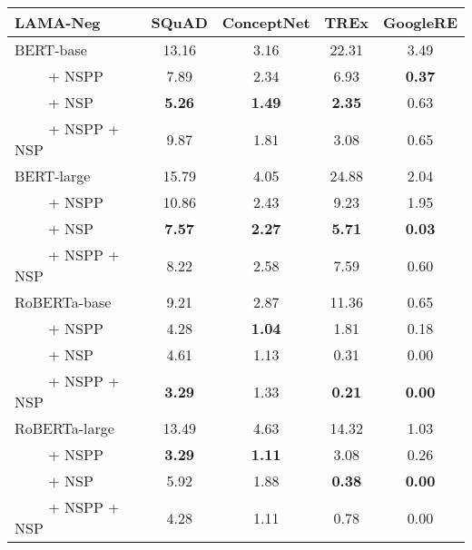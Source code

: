 \newcommand{\sig}{$^{\ast}$}
\setlength{\tabcolsep}{0.03in}
\small
\begin{tabular}{l cccc}
\toprule
LAMA-Neg& SQuAD & ConceptNet & TREx & GoogleRE \\
\midrule
{BERT-base} & 13.16 & 3.16 & 22.31 & 3.49 \\
~~~~ + NSPP & 7.89 & 2.34 & 6.93 & \textbf{0.37} \\
~~~~ + NSP & \textbf{5.26} & \textbf{1.49} &  \textbf{2.35} & 0.63 \\
~~~~ + NSPP + NSP & 9.87 & 1.81 & 3.08 & 0.65 \\
\midrule
{BERT-large} &  15.79 & 4.05 & 24.88 & 2.04 \\
~~~~ + NSPP & 10.86 & 2.43 & 9.23 & 1.95 \\
~~~~ + NSP & \textbf{7.57} & \textbf{2.27} & \textbf{5.71} & \textbf{0.03} \\
~~~~ + NSPP + NSP & 8.22 & 2.58 & 7.59 & 0.60 \\

\midrule
\midrule

{RoBERTa-base} & 9.21 & 2.87 & 11.36 & 0.65 \\
~~~~ + NSPP & 4.28 & \textbf{1.04} & 1.81 & 0.18 \\
~~~~ + NSP & 4.61 & 1.13 & 0.31 & 0.00 \\
~~~~ + NSPP + NSP & \textbf{3.29} & 1.33 & \textbf{0.21} & \textbf{0.00} \\
\midrule
{RoBERTa-large} & 13.49 & 4.63 & 14.32 & 1.03 \\
~~~~ + NSPP & \textbf{3.29} & \textbf{1.11} & 3.08 & 0.26 \\
~~~~ + NSP & 5.92 & 1.88 & \textbf{0.38} & \textbf{0.00} \\
~~~~ + NSPP + NSP & 4.28 & 1.11 & 0.78 & 0.00 \\
\bottomrule
\end{tabular}
